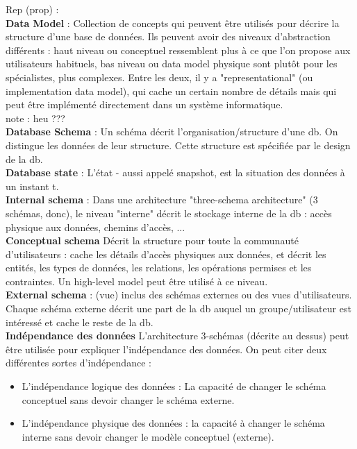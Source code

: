 \noindent
Rep (prop) :\\ 
\textbf{Data Model} : Collection de concepts qui peuvent être 
utilisés pour décrire la structure d'une base de données. Ils peuvent avoir 
des niveaux d'abstraction différents : haut niveau ou conceptuel ressemblent 
plus à ce que l'on propose aux utilisateurs habituels, 
bas niveau ou data model physique sont plutôt pour les spécialistes, plus complexes.
Entre les deux, il y a "representational" (ou implementation data model), qui 
cache un certain nombre de détails mais qui peut être implémenté directement dans
un système informatique.\\
note : heu ??? \\
\textbf{Database Schema} : 
Un schéma décrit l'organisation/structure d'une db. On distingue les données 
de leur structure. Cette structure est spécifiée par le design de la db.\\
\textbf{Database state} : L'état - aussi appelé snapshot, est la situation 
des données à un instant t. \\
\textbf{Internal schema} : 
Dans une architecture "three-schema architecture" (3 schémas, donc), 
le niveau "interne" décrit le stockage interne de la db : accès physique aux données, chemins d'accès, ... \\
\textbf{Conceptual schema}
Décrit la structure pour toute la communauté d'utilisateurs : 
cache les détails d'accès physiques aux données, et décrit les entités, 
les types de données, les relations, les opérations permises et les contraintes.
Un high-level model peut être utilisé à ce niveau.\\
\textbf{External schema} :
(vue) inclus des schémas externes ou des vues d'utilisateurs. Chaque schéma externe décrit une part de la db auquel un groupe/utilisateur est intéressé et cache le reste de la db.\\
\textbf{Indépendance des données}
L'architecture 3-schémas (décrite au dessus) peut être utilisée pour expliquer l'indépendance des données. On peut citer deux différentes sortes d'indépendance :
\begin{itemize}
	\item L'indépendance logique des données : La capacité de changer le schéma conceptuel sans devoir changer le schéma externe.
	\item L'indépendance physique des données : la capacité à changer le schéma interne sans devoir changer le modèle conceptuel (externe). 
\end{itemize}

